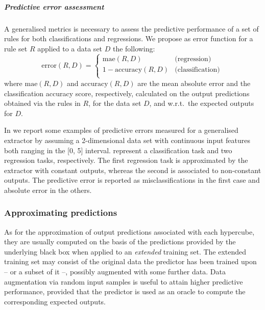 \documentclass[
]{ceurart}
\begin{document}
\subparagraph{Predictive error assessment}

A generalised metrics is necessary to assess the predictive performance of a set of rules for both classifications and regressions.
%
We propose as error function for a rule set $R$ applied to a data set $D$ the following:
%
\begin{equation}\label{eq:error}
	\text{error}(R, D) = 
	\begin{cases}
		\text{mae}(R, D) & \text{(regression)}\\
		1 - \text{accuracy}(R, D) & \text{(classification)}\\
	\end{cases}\,
\end{equation}
%
where $\text{mae}(R, D)$ and $\text{accuracy}(R, D)$ are the mean absolute error and the classification accuracy score, respectively, calculated on the output predictions obtained via the rules in $R$, for the data set $D$, and w.r.t.\ the expected outputs for $D$.



In  we report some examples of predictive errors measured for a generalised extractor by assuming a 2-dimensional data set with continuous input features both ranging in the [0, 5] interval.
%
 represent a classification task and two regression tasks, respectively.
%
The first regression task is approximated by the extractor with constant outputs, whereas the second is associated to non-constant outputs.
%
The predictive error is reported as misclassifications in the first case and absolute error in the others.
 
\subsubsection{Approximating predictions}

As for the approximation of output predictions associated with each hypercube, they are usually computed on the basis of the predictions provided by the underlying black box when applied to an \emph{extended} training set.
%
The extended training set may consist of the original data the predictor has been trained upon -- or a subset of it --, possibly augmented with some further data.
%
Data augmentation via random input samples is useful to attain higher predictive performance, provided that the predictor is used as an oracle to compute the corresponding expected outputs.
\end{document}
